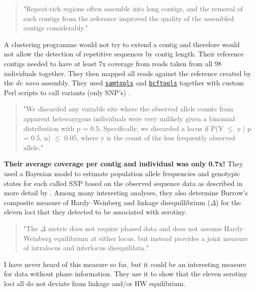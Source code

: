 \documentclass{article}\usepackage[]{graphicx}\usepackage[]{color}
\begin{document}
\begin{quote}
"Repeat-rich regions often assemble into long contigs, and the removal of such contigs from the reference improved the quality of the assembled contigs considerably."
\end{quote}

A clustering programme would not try to extend a contig and therefore would not allow the detection of repetitive sequences by contig length. Their reference contigs needed to have at least 7x coverage from reads taken from all 98 individuals together. They then mapped all reads against the reference created by the \emph{de novo} assembly. They used \href{https://github.com/samtools/samtools}{\texttt{samtools}} and \href{http://samtools.github.io/bcftools/}{\texttt{bcftools}} together with custom Perl scripts to call variants (only SNP's) \citep{Li2011}.

\begin{quote}
"We discarded any variable site where the observed allele counts from apparent heterozygous individuals were very unlikely given a binomial distribution with p = 0.5. Specifically, we discarded a locus if P(Y $\le$ y | p = 0.5, n) $\le$ 0.05, where y is the count of the less frequently observed allele."
\end{quote}

\textbf{Their average coverage per contig and individual was only 0.7x!} They used a Bayesian model to estimate population allele frequencies and genotypic states for each called SNP based on the observed sequence data as described in more detail by \cite[see below]{Gompert2012a}. Among many interesting analyses, they also determine Burrow's composite measure of Hardy--Weinberg and linkage disequillibrium ($\Delta$) \cite[see p. 125]{Weir1996,Weir1979} for the eleven loci that they detected to be associated with serotiny.

\begin{quote}
"The $\Delta$ metric does not require phased data and does not assume Hardy--Weinberg equilibrium at either locus, but instead provides a joint measure of intralocus and interlocus disequilibria."
\end{quote}

I have never heard of this measure so far, but it could be an interesting measure for data without phase information. They use it to show that the eleven serotiny loci all do not deviate from linkage and/or HW equilibrium.
\end{document}
